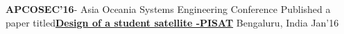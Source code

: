 \begin{cvhonors}
	\cvhonor
	{\textbf{APCOSEC'16}- Asia Oceania Systems Engineering Conference}
	{Published a paper titled\href{https://onlinelibrary.wiley.com/doi/abs/10.1002/j.2334-5837.2016.00331.x}\textbf{Design of a student satellite -PISAT}}
	{Bengaluru, India}
	{Jan'16}
\end{cvhonors}
